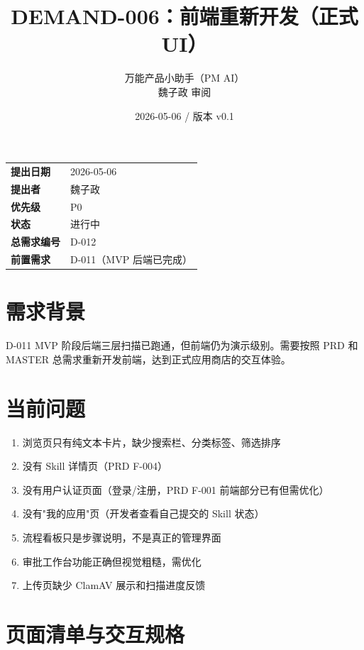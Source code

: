 \documentclass[11pt,a4paper]{article}
\title{\textbf{DEMAND-006：前端重新开发（正式 UI）}}
\author{万能产品小助手（PM AI）\\魏子政 审阅}
\date{2026-05-06 / 版本 v0.1}
\begin{document}
\maketitle

\begin{center}
\begin{tabular}{>{\bfseries}p{3cm} p{10cm}}
\toprule
提出日期 & 2026-05-06 \\
提出者 & 魏子政 \\
优先级 & \textcolor{danger}{P0} \\
状态 & \textcolor{progress}{进行中} \\
总需求编号 & D-012 \\
前置需求 & D-011（MVP 后端已完成） \\
\bottomrule
\end{tabular}
\end{center}

\vspace{1em}

\section{需求背景}

D-011 MVP 阶段后端三层扫描已跑通，但前端仍为演示级别。需要按照 PRD 和 MASTER 总需求重新开发前端，达到正式应用商店的交互体验。

\section{当前问题}

\begin{enumerate}[nosep]
  \item 浏览页只有纯文本卡片，缺少搜索栏、分类标签、筛选排序
  \item 没有 Skill 详情页（PRD F-004）
  \item 没有用户认证页面（登录/注册，PRD F-001 前端部分已有但需优化）
  \item 没有"我的应用"页（开发者查看自己提交的 Skill 状态）
  \item 流程看板只是步骤说明，不是真正的管理界面
  \item 审批工作台功能正确但视觉粗糙，需优化
  \item 上传页缺少 ClamAV 展示和扫描进度反馈
\end{enumerate}

\section{页面清单与交互规格}
\end{document}
